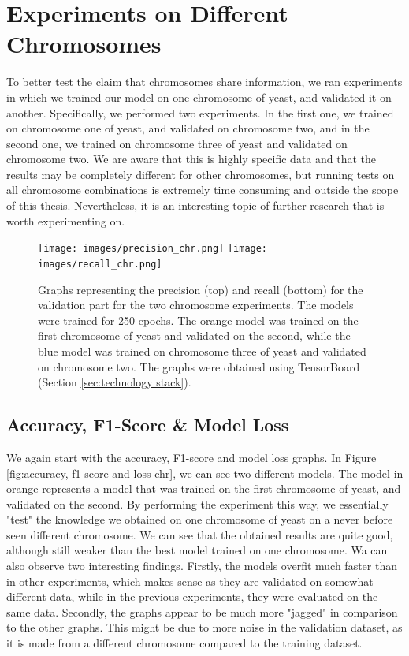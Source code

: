 \documentclass[times, utf8, diplomski, english]{fer_eng}
\begin{document}
\section{Experiments on Different Chromosomes}
\label{sec:experiments on different chromosomes}

To better test the claim that chromosomes share information, we ran experiments in which we trained our model on one chromosome of yeast, and validated it on another. Specifically, we performed two experiments. In the first one, we trained on chromosome one of yeast, and validated on chromosome two, and in the second one, we trained on chromosome three of yeast and validated on chromosome two. We are aware that this is highly specific data and that the results may be completely different for other chromosomes, but running tests on all chromosome combinations is extremely time consuming and outside the scope of this thesis. Nevertheless, it is an interesting topic of further research that is worth experimenting on.

\begin{figure}[h]
	\centering
	\texttt{[image: images/precision\_chr.png]}
	\texttt{[image: images/recall\_chr.png]}
	\caption[Precision and recall graph on chromosomes]{Graphs representing the precision (top) and recall (bottom) for the validation part for the two chromosome experiments. The models were trained for 250 epochs. The orange model was trained on the first chromosome of yeast and validated on the second, while the blue model was trained on chromosome three of yeast and validated on chromosome two. The graphs were obtained using TensorBoard (Section \ref{sec:technology stack}).}
	\label{fig:precision and recall chr}
\end{figure}

\subsection{Accuracy, F1-Score \& Model Loss}
\label{subsec:accuracy, f1-score and model loss chr}

We again start with the accuracy, F1-score and model loss graphs. In Figure \ref{fig:accuracy, f1 score and loss chr}, we can see two different models. The model in orange represents a model that was trained on the first chromosome of yeast, and validated on the second. By performing the experiment this way, we essentially "test" the knowledge we obtained on one chromosome of yeast on a never before seen different chromosome. We can see that the obtained results are quite good, although still weaker than the best model trained on one chromosome. Wa can also observe two interesting findings. Firstly, the models overfit much faster than in other experiments, which makes sense as they are validated on somewhat different data, while in the previous experiments, they were evaluated on the same data. Secondly, the graphs appear to be much more "jagged" in comparison to the other graphs. This might be due to more noise in the validation dataset, as it is made from a different chromosome compared to the training dataset.
\end{document}

